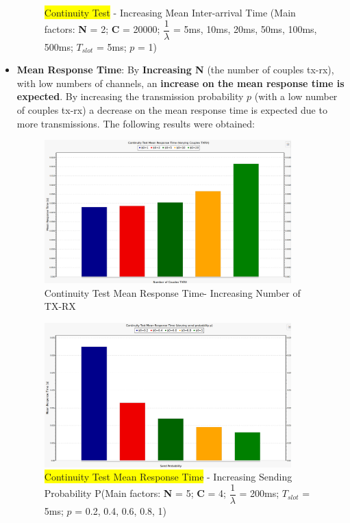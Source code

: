\begin{itemize}
\begin{figure}[H]
		\caption{\colorbox{yellow}{Continuity Test} - Increasing Mean Inter-arrival Time (Main factors: \textbf{N} = 2; \textbf{C} = 20000; $\dfrac{1}{\lambda}$ = 5ms, 10ms, 20ms, 50ms, 100ms, 500ms; $T_{slot}$ = 5ms; $p$ = 1)}
		\label {img: continuityTestThLambda}
	\end{figure}
	\item \textbf{Mean Response Time}: By \textbf{Increasing N} (the number of couples tx-rx), with low numbers of channels, an \textbf{increase on the mean response time is expected}. By increasing the transmission probability $p$ (with a low number of couples tx-rx) a decrease on the mean response time is expected due to more transmissions. The following results were obtained:
	\begin{figure}[H]
		\centering
		\includegraphics[width=0.9\textwidth]{img/ContinuityTest_ResponseTIme_TXRXVarying}
		\caption{Continuity Test Mean Response Time- Increasing Number of TX-RX}
		\label {img: continuityTestTXRXResponse}
	\end{figure}
	\begin{figure}[H]
		\centering
		\includegraphics[width=0.9\textwidth]{img/ContinuityTest_ResponseTIme_VaryingP.png}
		\caption{\colorbox{yellow}{Continuity Test Mean Response Time} - Increasing Sending Probability P(Main factors: \textbf{N} = 5; \textbf{C} = 4; $\dfrac{1}{\lambda}$ = 200ms; $T_{slot}$ = 5ms; $p$ = 0.2, 0.4, 0.6, 0.8, 1)}
		\label {img: continuityTestResponseLambda}
	\end{figure}
\end{itemize} 
